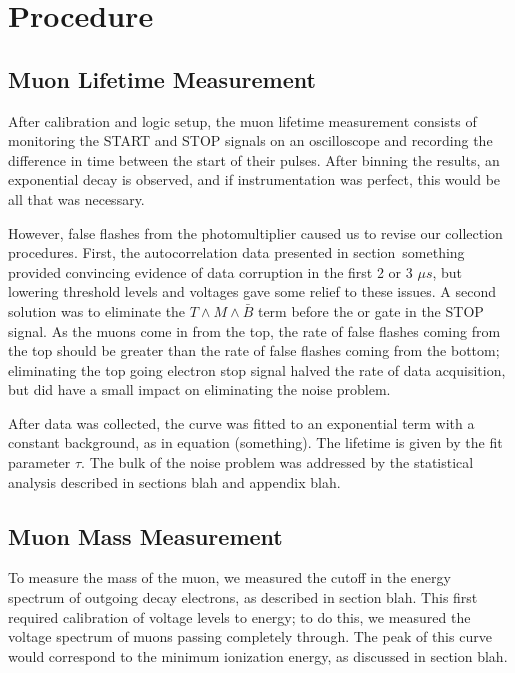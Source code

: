 \section{Procedure}

\subsection{Muon Lifetime Measurement}

After calibration and logic setup, the muon lifetime measurement consists of monitoring the START and STOP signals on an oscilloscope and recording the difference in time between the start of their pulses. After binning the results, an exponential decay is observed, and if instrumentation was perfect, this would be all that was necessary.

However, false flashes from the photomultiplier caused us to revise our collection procedures. First, the autocorrelation data presented in section~something provided convincing evidence of data corruption in the first 2 or 3 $\mu s$, but lowering threshold levels and voltages gave some relief to these issues. A second solution was to eliminate the $T \wedge M \wedge \bar{B}$ term before the or gate in the STOP signal. As the muons come in from the top, the rate of false flashes coming from the top should be greater than the rate of false flashes coming from the bottom; eliminating the top going electron stop signal halved the rate of data acquisition, but did have a small impact on eliminating the noise problem. 

After data was collected, the curve was fitted to an exponential term with a constant background, as in equation (something). The lifetime is given by the fit parameter $\tau$. The bulk of the noise problem was addressed by the statistical analysis described in sections blah and appendix blah.

\subsection{Muon Mass Measurement}

To measure the mass of the muon, we measured the cutoff in the energy spectrum of outgoing decay electrons, as described in section blah. This first required calibration of voltage levels to energy; to do this, we measured the voltage spectrum of muons passing completely through. The peak of this curve would correspond to the minimum ionization energy, as discussed in section blah. 

